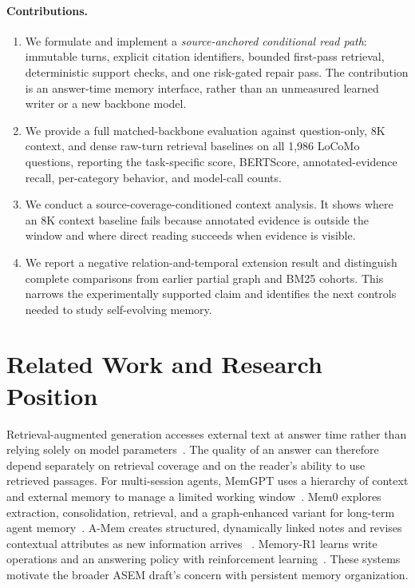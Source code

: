 \documentclass[11pt]{article}
\begin{document}
\paragraph{Contributions.}
\begin{enumerate}
  \item We formulate and implement a \emph{source-anchored conditional read
  path}: immutable turns, explicit citation identifiers, bounded first-pass
  retrieval, deterministic support checks, and one risk-gated repair pass.
  The contribution is an answer-time memory interface, rather than an
  unmeasured learned writer or a new backbone model.
  \item We provide a full matched-backbone evaluation against question-only,
  8K context, and dense raw-turn retrieval baselines on all 1,986 LoCoMo
  questions, reporting the task-specific score, BERTScore, annotated-evidence
  recall, per-category behavior, and model-call counts.
  \item We conduct a source-coverage-conditioned context analysis. It shows
  where an 8K context baseline fails because annotated evidence is outside
  the window and where direct reading succeeds when evidence is visible.
  \item We report a negative relation-and-temporal extension result and
  distinguish complete comparisons from earlier partial graph and BM25
  cohorts. This narrows the experimentally supported claim and identifies
  the next controls needed to study self-evolving memory.
\end{enumerate}

\section{Related Work and Research Position}
\label{sec:related}

Retrieval-augmented generation accesses external text at answer time rather
than relying solely on model parameters~\cite{lewis2020rag}. The quality of
an answer can therefore depend separately on retrieval coverage and on the
reader's ability to use retrieved passages. For multi-session agents,
MemGPT uses a hierarchy of context and external memory to manage a limited
working window~\cite{packer2023memgpt}. Mem0 explores extraction,
consolidation, retrieval, and a graph-enhanced variant for long-term agent
memory~\cite{chhikara2025mem0}. A-Mem creates structured, dynamically linked
notes and revises contextual attributes as new information arrives
~\cite{amem2025}. Memory-R1 learns write operations and an answering policy
with reinforcement learning~\cite{memoryr12025}. These systems motivate the
broader ASEM draft's concern with persistent memory organization.
\end{document}
